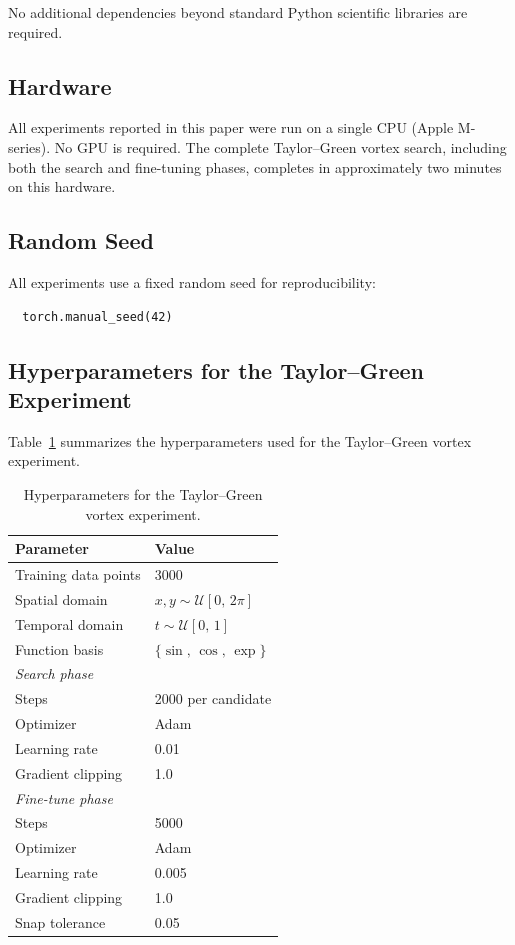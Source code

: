 No additional dependencies beyond standard Python scientific libraries
are required.

\subsection{Hardware}

All experiments reported in this paper were run on a single CPU (Apple
M-series). No GPU is required. The complete Taylor--Green vortex search,
including both the search and fine-tuning phases, completes in
approximately two minutes on this hardware.

\subsection{Random Seed}

All experiments use a fixed random seed for reproducibility:
\begin{verbatim}
  torch.manual_seed(42)
\end{verbatim}

\subsection{Hyperparameters for the Taylor--Green Experiment}

Table~\ref{tab:hyperparams} summarizes the hyperparameters used for
the Taylor--Green vortex experiment.

\begin{table}[h]
\centering
\caption{Hyperparameters for the Taylor--Green vortex experiment.}
\label{tab:hyperparams}
\begin{tabular}{ll}
\toprule
\textbf{Parameter} & \textbf{Value} \\
\midrule
Training data points     & 3000 \\
Spatial domain           & $x, y \sim \mathcal{U}[0,\, 2\pi]$ \\
Temporal domain          & $t \sim \mathcal{U}[0,\, 1]$ \\
Function basis           & $\{\sin,\, \cos,\, \exp\}$ \\
\midrule
\multicolumn{2}{l}{\textit{Search phase}} \\
\quad Steps              & 2000 per candidate \\
\quad Optimizer          & Adam \\
\quad Learning rate      & 0.01 \\
\quad Gradient clipping  & 1.0 \\
\midrule
\multicolumn{2}{l}{\textit{Fine-tune phase}} \\
\quad Steps              & 5000 \\
\quad Optimizer          & Adam \\
\quad Learning rate      & 0.005 \\
\quad Gradient clipping  & 1.0 \\
\midrule
Snap tolerance           & 0.05 \\
\bottomrule
\end{tabular}
\end{table}

